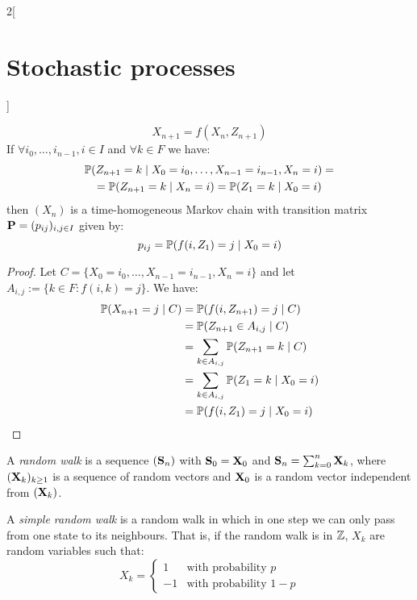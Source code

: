 \documentclass[../../../main_math.tex]{subfiles}
\begin{document}
\begin{multicols}{2}[\section{Stochastic processes}]
\begin{lemma}
    $$
      X_{n+1}=f(X_n,Z_{n+1})
    $$
    If $\forall i_0,\ldots,i_{n-1},i\in I$ and $\forall k\in F$ we have:
    \begin{multline*}
      \mathbb{P}(Z_{n+1}=k\mid X_0=i_0,\ldots,X_{n-1}=i_{n-1},X_n=i)=\\=\mathbb{P}(Z_{n+1}=k\mid X_n=i)=\mathbb{P}(Z_{1}=k\mid X_0=i)
    \end{multline*}
    then $(X_n)$ is a time-homogeneous Markov chain with transition matrix $\boldsymbol{\mathrm{P}}=(p_{ij})_{i,j\in I}$ given by:
    $$
      p_{ij}=\mathbb{P}(f(i,Z_1)=j\mid X_0=i)
    $$
  \end{lemma}
  \begin{proof}
    Let $C=\{X_0=i_0,\ldots,X_{n-1}=i_{n-1},X_n=i\}$ and let $A_{i,j}:=\{k\in F:f(i,k)=j\}$. We have:
    \begin{align*}
      \mathbb{P}(X_{n+1}=j\mid C) & =\mathbb{P}(f(i,Z_{n+1})=j\mid C)                 \\
                             & =\mathbb{P}(Z_{n+1}\in A_{i,j}\mid C)             \\
                             & =\sum_{k\in A_{i,j}}\mathbb{P}(Z_{n+1}=k\mid C)   \\
                             & =\sum_{k\in A_{i,j}}\mathbb{P}(Z_{1}=k\mid X_0=i) \\
                             & =\mathbb{P}(f(i,Z_{1})=j\mid X_0=i)
    \end{align*}
  \end{proof}
  \begin{definition}
    A \emph{random walk} is a sequence $(\boldsymbol{\mathrm{S}}_n)$ with $\boldsymbol{\mathrm{S}}_0=\boldsymbol{\mathrm{X}}_0$ and $\boldsymbol{\mathrm{S}}_n=\sum_{k=0}^{n}\boldsymbol{\mathrm{X}}_k$, where $(\boldsymbol{\mathrm{X}}_k)_{k\geq 1}$ is a sequence of \iid random vectors and $\boldsymbol{\mathrm{X}}_0$ is a random vector independent from $(\boldsymbol{\mathrm{X}}_k)$.
  \end{definition}
  \begin{definition}
    A \emph{simple random walk} is a random walk in which in one step we can only pass from one state to its neighbours. That is, if the random walk is in $\mathbb{Z}$, $X_k$ are random variables such that:
    $$
      X_k=\begin{cases}
        1  & \text{with probability $p$}   \\
        -1 & \text{with probability $1-p$}
      \end{cases}
    $$
  \end{definition}
  \begin{figure}[H]
    \centering
    

\end{figure}
\end{multicols}
\end{document}
